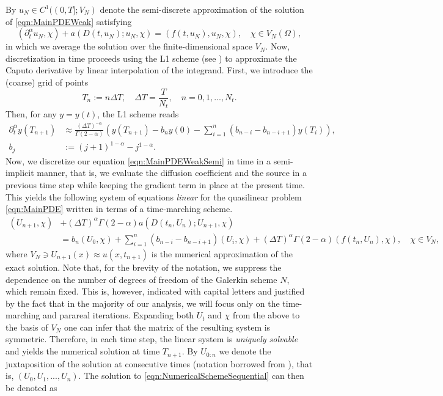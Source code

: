 \documentclass[12pt,a4paper]{article}
\begin{document}
By $u_N \in C^1((0,T]; V_N)$ denote the semi-discrete approximation of the solution of \eqref{eqn:MainPDEWeak} satisfying
\begin{equation}\label{eqn:MainPDEWeakSemi}
	\left(\partial^\alpha_t u_N, \chi\right) + a(D(t,u_N); u_N, \chi) = (f(t,u_N), u_N, \chi), \quad \chi \in V_N(\Omega),
\end{equation}
in which we average the solution over the finite-dimensional space $V_N$. Now, discretization in time proceeds using the L1 scheme (see \cite{del2025note}) to approximate the Caputo derivative by linear interpolation of the integrand. First, we introduce the (coarse) grid of points 
\begin{equation}
	T_n := n \Delta T, \quad \Delta T = \frac{T}{N_t}, \quad n = 0, 1, ..., N_t.
\end{equation}
Then, for any $y=y(t)$, the L1 scheme reads
\begin{equation}\label{eqn:L1Scheme}
	\begin{split}
		\partial^\alpha_t y(T_{n+1}) &\approx \frac{(\Delta T)^{-\alpha}}{\Gamma(2-\alpha)}\left(y(T_{n+1}) - b_{n} y(0) - \sum_{i = 1}^{n} \left(b_{n-i}-b_{n-i+1}\right) y(T_i)\right), \\ b_j &:= (j+1)^{1-\alpha} - j^{1-\alpha}. 
	\end{split}
\end{equation}
Now, we discretize our equation \eqref{eqn:MainPDEWeakSemi} in time in a semi-implicit manner, that is, we evaluate the diffusion coefficient and the source in a previous time step while keeping the gradient term in place at the present time. This yields the following system of equations \emph{linear} for the quasilinear problem \eqref{eqn:MainPDE} written in terms of a time-marching scheme.
\begin{equation}\label{eqn:NumericalSchemeSequential}
	\begin{split}
		(U_{n+1}, \chi) &+ \left(\Delta T\right)^\alpha \Gamma(2-\alpha) a(D(t_n, U_{n}); U_{n+1}, \chi) \\
		&= b_{n} \left(U_{0}, \chi\right) + \sum_{i = 1}^{n} \left(b_{n-i}-b_{n-i+1}\right) \left(U_{i}, \chi\right) + \left(\Delta T\right)^\alpha \Gamma(2-\alpha) (f(t_n, U_{n}), \chi), \quad \chi \in V_N, 
	\end{split}
\end{equation}
where $V_N \ni U_{n+1}(x) \approx u(x, t_{n+1})$ is the numerical approximation of the exact solution. Note that, for the brevity of the notation, we suppress the dependence on the number of degrees of freedom of the Galerkin scheme $N$, which remain fixed. This is, however, indicated with capital letters and justified by the fact that in the majority of our analysis, we will focus only on the time-marching and parareal iterations. Expanding both $U_{t}$ and $\chi$ from the above to the basis of $V_N$ one can infer that the matrix of the resulting system is symmetric. Therefore, in each time step, the linear system is \emph{uniquely solvable} and yields the numerical solution at time $T_{n+1}$. By $U_{0:n}$ we denote the juxtaposition of the solution at consecutive times (notation borrowed from \cite{xu2015parareal}), that is, $(U_{0}, U_{1}, ..., U_{n})$. The solution to \eqref{eqn:NumericalSchemeSequential} can then be denoted as
\end{document}
